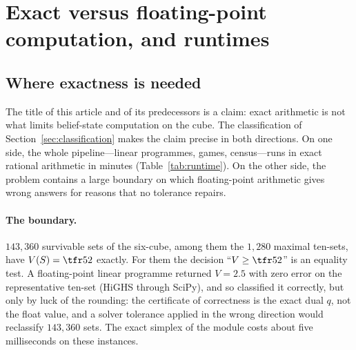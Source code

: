 \section{Exact versus floating-point computation, and runtimes}\label{sec:float}

\subsection{Where exactness is needed}
The title of this article and of its predecessors is a claim: exact arithmetic is not what limits belief-state computation on the cube. The classification of Section~\ref{sec:classification} makes the claim precise in both directions. On one side, the whole pipeline---linear programmes, games, census---runs in exact rational arithmetic in minutes (Table~\ref{tab:runtime}). On the other side, the problem contains a large boundary on which floating-point arithmetic gives wrong answers for reasons that no tolerance repairs.

\paragraph{The boundary.}
$143{,}360$ survivable sets of the six-cube, among them the $1{,}280$ maximal ten-sets, have $V(S)=\tfr52$ exactly. For them the decision ``$V\ge\tfr52$'' is an equality test. A floating-point linear programme returned $V=2.5$ with zero error on the representative ten-set (HiGHS \cite{HuangfuHall2018} through SciPy), and so classified it correctly, but only by luck of the rounding: the certificate of correctness is the exact dual $q$, not the float value, and a solver tolerance applied in the wrong direction would reclassify $143{,}360$ sets. The exact simplex of the module costs about five milliseconds on these instances.

